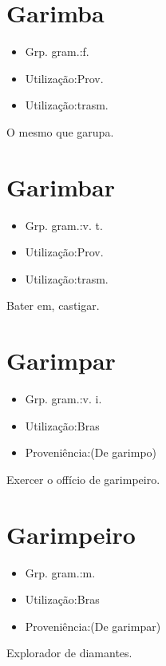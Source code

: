 \section{Garimba}
\begin{itemize}
\item {Grp. gram.:f.}
\end{itemize}
\begin{itemize}
\item {Utilização:Prov.}
\end{itemize}
\begin{itemize}
\item {Utilização:trasm.}
\end{itemize}
O mesmo que \textunderscore garupa\textunderscore .
\section{Garimbar}
\begin{itemize}
\item {Grp. gram.:v. t.}
\end{itemize}
\begin{itemize}
\item {Utilização:Prov.}
\end{itemize}
\begin{itemize}
\item {Utilização:trasm.}
\end{itemize}
Bater em, castigar.
\section{Garimpar}
\begin{itemize}
\item {Grp. gram.:v. i.}
\end{itemize}
\begin{itemize}
\item {Utilização:Bras}
\end{itemize}
\begin{itemize}
\item {Proveniência:(De \textunderscore garimpo\textunderscore )}
\end{itemize}
Exercer o offício de garimpeiro.
\section{Garimpeiro}
\begin{itemize}
\item {Grp. gram.:m.}
\end{itemize}
\begin{itemize}
\item {Utilização:Bras}
\end{itemize}
\begin{itemize}
\item {Proveniência:(De \textunderscore garimpar\textunderscore )}
\end{itemize}
Explorador de diamantes.
